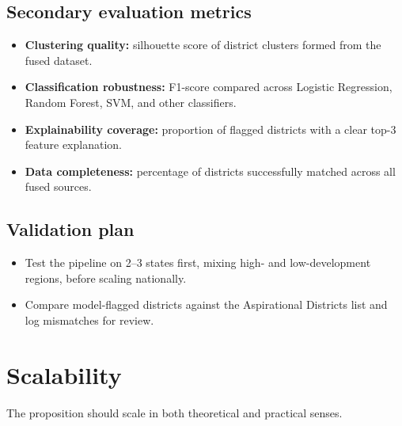 \documentclass[11pt,a4paper]{article}
\newcommand{\BvrHint}[1]{%
  {\normalfont\normalsize\itshape\hfill #1}}
\begin{document}
\subsection{Secondary evaluation metrics}
\begin{itemize}[leftmargin=0.7cm]
    \item \textbf{Clustering quality:} silhouette score of district clusters formed from the fused dataset.
    \item \textbf{Classification robustness:} F1-score compared across Logistic Regression, Random Forest, SVM, and other classifiers.
    \item \textbf{Explainability coverage:} proportion of flagged districts with a clear top-3 feature explanation.
    \item \textbf{Data completeness:} percentage of districts successfully matched across all fused sources.
\end{itemize}

\subsection{Validation plan %
}
\begin{itemize}[leftmargin=0.7cm]
    \item Test the pipeline on 2–3 states first, mixing high- and low-development regions, before scaling nationally.
    \item Compare model-flagged districts against the Aspirational Districts list and log mismatches for review.
\end{itemize}

\section{Scalability %
}
The proposition should scale in both theoretical and practical senses.
\end{document}

